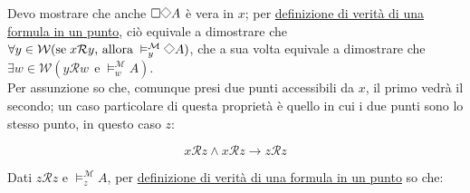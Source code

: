 \documentclass[a4paper,12pt]{article}
\newcommand{\Dmd}{\mathord{\vcenter{\hbox{\tikz[baseline=-0.6ex]{\draw[line width=0.4pt, scale=1, rotate=45] (0,0) rectangle (0.2,0.2);}}}}} %
\begin{document}
\begin{dimo}
\begin{enumerate}
\begin{minipage}{0.48\textwidth}
		\end{minipage}
		\vspace{8pt}
		
		Devo mostrare che anche $\Box \Dmd A$ è vera in $x$; per \hyperlink{defverp}{definizione di verità di una formula in un punto}, ciò equivale a dimostrare che $\forall y \in \mathcal{W} (\text{se} \; x\mathcal{R}y  \text{, allora} \; \vDash_y^{\mathcal{M}} \Dmd A)$, che a sua volta equivale a dimostrare che $\exists w \in \mathcal{W} (y\mathcal{R}w \;\, \text{e} \; \vDash_w^{\mathcal{M}} A)$.\\
		Per assunzione so che, comunque presi due punti accessibili da $x$, il primo vedrà il secondo; un caso particolare di questa proprietà è quello in cui i due punti sono lo stesso punto, in questo caso $z$: 
		
		\begin{minipage}{0.48\textwidth}
			$$x\mathcal{R}z \land x\mathcal{R}z \to z\mathcal{R}z$$
		\end{minipage}
		\begin{minipage}{0.48\textwidth}
			\begin{center}
			\end{center}
		\end{minipage}
		\vspace{8pt}
		
		Dati $z\mathcal{R}z$ e $\vDash_z^{\mathcal{M}} A$, per \hyperlink{defverp}{definizione di verità di una formula in un punto} so che: \\
		

\end{enumerate}
\end{dimo}
\end{document}
